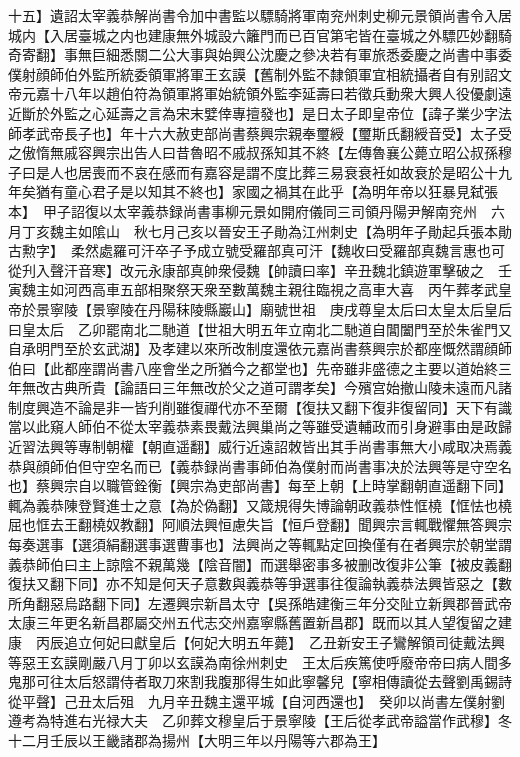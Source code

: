 十五】遺詔太宰義恭解尚書令加中書監以驃騎將軍南兖州刺史柳元景領尚書令入居城内【入居臺城之内也建康無外城設六籬門而已百官第宅皆在臺城之外驃匹妙翻騎奇寄翻】事無巨細悉關二公大事與始興公沈慶之參决若有軍旅悉委慶之尚書中事委僕射顔師伯外監所統委領軍將軍王玄謨【舊制外監不隸領軍宜相統攝者自有别詔文帝元嘉十八年以趙伯符為領軍將軍始統領外監李延壽曰若徵兵動衆大興人役優劇遠近斷於外監之心延壽之言為宋末嬖倖專擅發也】是日太子即皇帝位【諱子業少字法師孝武帝長子也】年十六大赦吏部尚書蔡興宗親奉璽綬【璽斯氏翻綬音受】太子受之傲惰無戚容興宗出告人曰昔魯昭不戚叔孫知其不終【左傳魯襄公薨立昭公叔孫穆子曰是人也居喪而不哀在感而有嘉容是謂不度比葬三易衰衰衽如故衰於是昭公十九年矣猶有童心君子是以知其不終也】家國之禍其在此乎【為明年帝以狂暴見弑張本】　甲子詔復以太宰義恭録尚書事柳元景如開府儀同三司領丹陽尹解南兖州　六月丁亥魏主如隂山　秋七月己亥以晉安王子勛為江州刺史【為明年子勛起兵張本勛古勲字】　柔然處羅可汗卒子予成立號受羅部真可汗【魏收曰受羅部真魏言惠也可從刋入聲汗音寒】改元永康部真帥衆侵魏【帥讀曰率】辛丑魏北鎮遊軍擊破之　壬寅魏主如河西高車五部相聚祭天衆至數萬魏主親往臨視之高車大喜　丙午葬孝武皇帝於景寧陵【景寧陵在丹陽秣陵縣巖山】廟號世祖　庚戌尊皇太后曰太皇太后皇后曰皇太后　乙卯罷南北二馳道【世祖大明五年立南北二馳道自閶闔門至於朱雀門又自承明門至於玄武湖】及孝建以來所改制度還依元嘉尚書蔡興宗於都座慨然謂顔師伯曰【此都座謂尚書八座會坐之所猶今之都堂也】先帝雖非盛德之主要以道始終三年無改古典所貴【論語曰三年無改於父之道可謂孝矣】今殯宫始撤山陵未遠而凡諸制度興造不論是非一皆刋削雖復禪代亦不至爾【復扶又翻下復非復留同】天下有識當以此窺人師伯不從太宰義恭素畏戴法興巢尚之等雖受遺輔政而引身避事由是政歸近習法興等專制朝權【朝直遥翻】威行近遠詔敇皆出其手尚書事無大小咸取决焉義恭與顔師伯但守空名而已【義恭録尚書事師伯為僕射而尚書事决於法興等是守空名也】蔡興宗自以職管銓衡【興宗為吏部尚書】每至上朝【上時掌翻朝直遥翻下同】輒為義恭陳登賢進士之意【為於偽翻】又箴規得失博論朝政義恭性恇橈【恇怯也橈屈也恇去王翻橈奴教翻】阿順法興恒慮失旨【恒戶登翻】聞興宗言輒戰懼無答興宗每奏選事【選須絹翻選事選曹事也】法興尚之等輒點定回換僅有在者興宗於朝堂謂義恭師伯曰主上諒陰不親萬幾【陰音闇】而選舉密事多被删改復非公筆【被皮義翻復扶又翻下同】亦不知是何天子意數與義恭等爭選事往復論執義恭法興皆惡之【數所角翻惡烏路翻下同】左遷興宗新昌太守【吳孫皓建衡三年分交阯立新興郡晉武帝太康三年更名新昌郡屬交州五代志交州嘉寧縣舊置新昌郡】既而以其人望復留之建康　丙辰追立何妃曰獻皇后【何妃大明五年薨】　乙丑新安王子鸞解領司徒戴法興等惡王玄謨剛嚴八月丁卯以玄謨為南徐州刺史　王太后疾篤使呼廢帝帝曰病人間多鬼那可往太后怒謂侍者取刀來割我腹那得生如此寧馨兒【寧相傳讀從去聲劉禹錫詩從平聲】己丑太后殂　九月辛丑魏主還平城【自河西還也】　癸卯以尚書左僕射劉遵考為特進右光禄大夫　乙卯葬文穆皇后于景寧陵【王后從孝武帝謚當作武穆】冬十二月壬辰以王畿諸郡為揚州【大明三年以丹陽等六郡為王】

